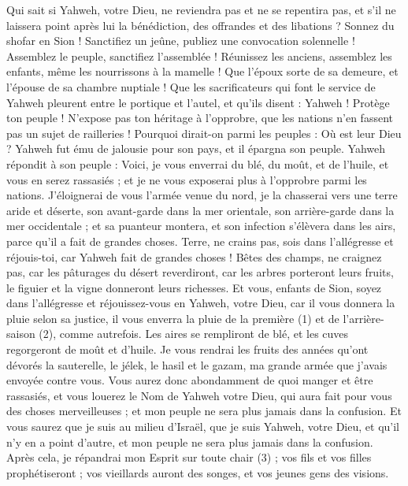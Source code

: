 \begin{multicols}{2}
Qui sait si Yahweh, votre Dieu, ne reviendra pas et ne se repentira pas, et s'il ne laissera point après lui la bénédiction, des offrandes et des libations ?
Sonnez du shofar en Sion ! Sanctifiez un jeûne, publiez une convocation solennelle !
Assemblez le peuple, sanctifiez l’assemblée ! Réunissez les anciens, assemblez les enfants, même les nourrissons à la mamelle ! Que l’époux sorte de sa demeure, et l’épouse de sa chambre nuptiale !
Que les sacrificateurs qui font le service de Yahweh pleurent entre le portique et l'autel, et qu'ils disent : Yahweh ! Protège ton peuple ! N’expose pas ton héritage à l'opprobre, que les nations n’en fassent pas un sujet de railleries ! Pourquoi dirait-on parmi les peuples : Où est leur Dieu ?
Yahweh fut ému de jalousie pour son pays, et il épargna son peuple.
Yahweh répondit à son peuple : Voici, je vous enverrai du blé, du moût, et de l'huile, et vous en serez rassasiés ; et je ne vous exposerai plus à l'opprobre parmi les nations.
J'éloignerai de vous l’armée venue du nord, je la chasserai vers une terre aride et déserte, son avant-garde dans la mer orientale, son arrière-garde dans la mer occidentale ; et sa puanteur montera, et son infection s’élèvera dans les airs, parce qu’il a fait de grandes choses.
Terre, ne crains pas, sois dans l’allégresse et réjouis-toi, car Yahweh fait de grandes choses !
Bêtes des champs, ne craignez pas, car les pâturages du désert reverdiront, car les arbres porteront leurs fruits, le figuier et la vigne donneront leurs richesses.
Et vous, enfants de Sion, soyez dans l’allégresse et réjouissez-vous en Yahweh, votre Dieu, car il vous donnera la pluie selon sa justice, il vous enverra la pluie de la première (1) et de l’arrière-saison (2), comme autrefois.
Les aires se rempliront de blé, et les cuves regorgeront de moût et d'huile.
Je vous rendrai les fruits des années qu’ont dévorés la sauterelle, le jélek, le hasil et le gazam, ma grande armée que j’avais envoyée contre vous.
Vous aurez donc abondamment de quoi manger et être rassasiés, et vous louerez le Nom de Yahweh votre Dieu, qui aura fait pour vous des choses merveilleuses ; et mon peuple ne sera plus jamais dans la confusion.
Et vous saurez que je suis au milieu d'Israël, que je suis Yahweh, votre Dieu, et qu'il n'y en a point d'autre, et mon peuple ne sera plus jamais dans la confusion.
Après cela, je répandrai mon Esprit sur toute chair (3) ; vos fils et vos filles prophétiseront ; vos vieillards auront des songes, et vos jeunes gens des visions.

\end{multicols}
